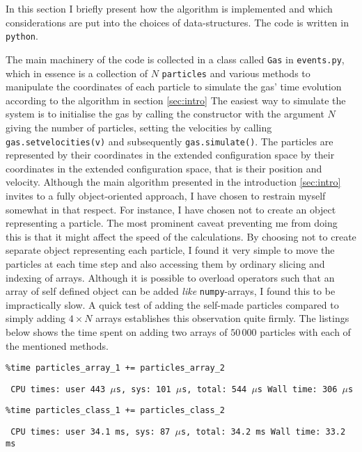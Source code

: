 In this section I briefly present how the algorithm is implemented and which considerations are put into the choices of data-structures. The code is written in \texttt{python}.


The main machinery of the code is collected in a class called \texttt{Gas} in \texttt{events.py}, which in essence is a collection of $N$ \texttt{particles} and various methods to manipulate the coordinates of each particle to simulate the gas' time evolution according to the algorithm in section \ref{sec:intro}
The easiest way to simulate the system is to initialise the gas by calling the constructor with the argument $N$ giving the number of particles, setting the velocities by calling \texttt{gas.set\textunderscore velocities(v)} and subsequently \texttt{gas.simulate()}.
The particles are represented by their coordinates in the extended configuration space by their coordinates in the extended configuration space, that is their position and velocity.
Although the main algorithm presented in the introduction \ref{sec:intro} invites to a fully object-oriented approach, I have chosen to restrain myself somewhat in that respect. 
For instance, I have chosen not to create an object representing a particle.
The most prominent caveat preventing me from doing this is that it might affect the speed of the calculations.
By choosing not to create separate object representing each particle, I found it very simple to move the particles at each time step and also accessing them by ordinary slicing and indexing of arrays. 
Although it is possible to overload operators such that an array of self defined object can be added \textit{like} \texttt{numpy}-arrays, I found this to be impractically slow. 
A quick test of adding the self-made particles compared to simply adding $4\times N$ arrays establishes this observation quite firmly. The listings below shows the time spent on adding two arrays of $50\,000$ particles with each of the mentioned methods.

\begin{lstlisting}
%time particles_array_1 += particles_array_2
\end{lstlisting}
\texttt{\small
CPU times: user 443 $\mu$s, sys: 101 $\mu$s, total: 544 $\mu$s
Wall time: 306 $\mu$s
}

\begin{lstlisting}
%time particles_class_1 += particles_class_2
\end{lstlisting}
\texttt{\small
CPU times: user 34.1 ms, sys: 87 $\mu$s, total: 34.2 ms
Wall time: 33.2 ms
}

